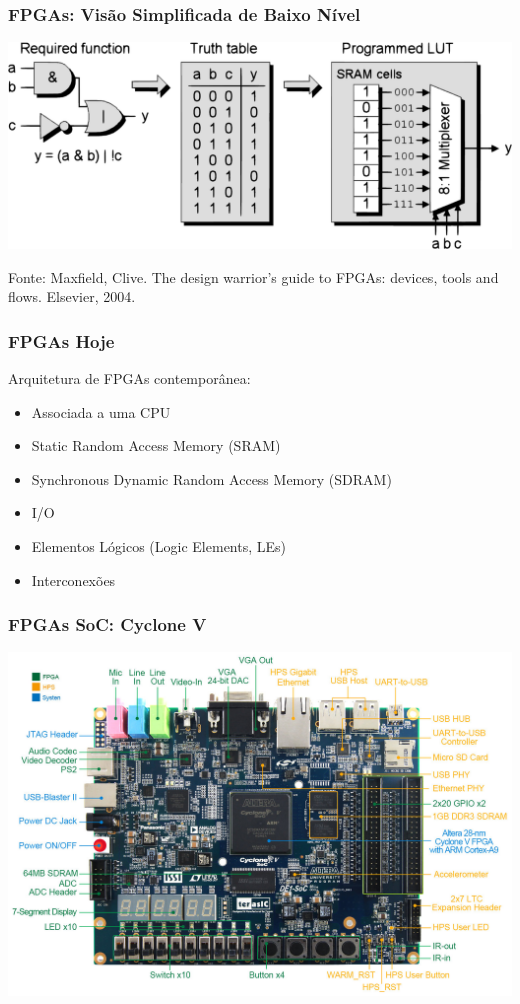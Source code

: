 \documentclass[10pt, compress, aspectratio=169, xcolor={table,usenames,dvipsnames}]{beamer}
\begin{document}
\begin{frame}
    \frametitle{FPGAs: Visão Simplificada de Baixo Nível}
    \begin{center}
        \includegraphics[width=.65\textwidth]{lut}
    \end{center}

    \vfill

    \begin{center}
        \scriptsize{Fonte: Maxfield, Clive. The design warrior's guide to FPGAs: devices, tools and flows. Elsevier, 2004.}
    \end{center}
\end{frame}

\begin{frame}
    \frametitle{FPGAs Hoje}
    Arquitetura de FPGAs contemporânea:
    \begin{itemize}
        \item Associada a uma \alert{CPU}
        \item Static Random Access Memory (\alert{SRAM})
        \item Synchronous Dynamic Random Access Memory (\alert{SDRAM})
        \item \alert{I/O}
        \item Elementos Lógicos (Logic Elements, \alert{LEs})
        \item Interconexões
    \end{itemize}
\end{frame}

\begin{frame}
    \frametitle{FPGAs SoC: Cyclone V}
    \begin{center}
        \includegraphics[width=.8\textwidth]{cycloneV}
    \end{center}
\end{frame}
\end{document}
